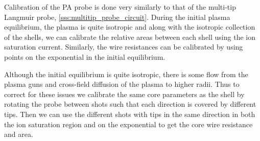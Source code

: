 


Calibration of the PA probe is done very similarly to that of the multi-tip Langmuir probe, \ref{sss:multitip_probe_circuit}. During the initial plasma equilibrium, the plasma is quite isotropic and along with the isotropic collection of the shells, we can calibrate the relative areas between each shell using the ion saturation current. Similarly, the wire resistances can be calibrated by using points on the exponential in the initial equilibrium.



Although the initial equilibrium is quite isotropic, there is some flow from the plasma guns and cross-field diffusion of the plasma to higher radii. Thus to correct for these issues we calibrate the same core parameters as the shell by rotating the probe between shots such that each direction is covered by different tips. Then we can use the different shots with tips in the same direction in both the ion saturation region and on the exponential to get the core wire resistance and area.


